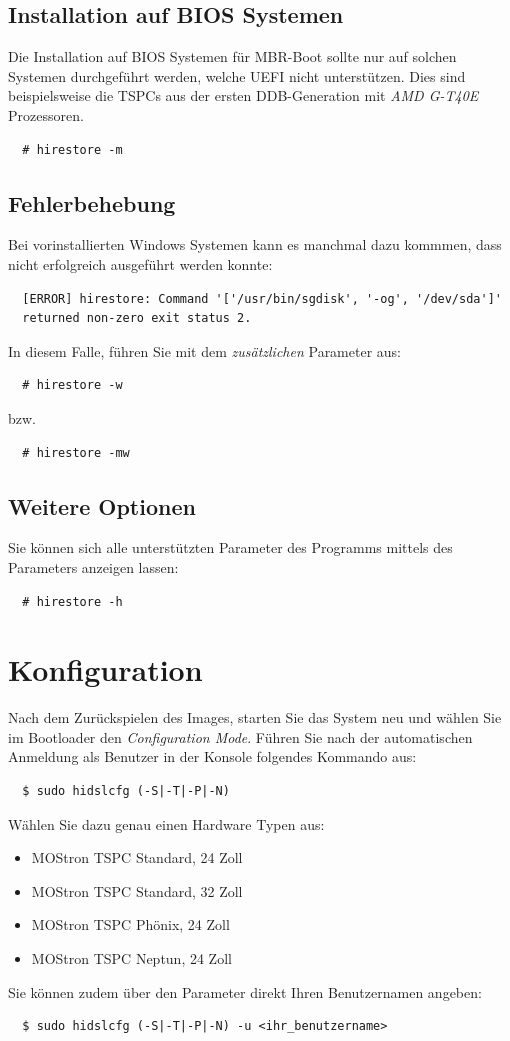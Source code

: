\documentclass[a4paper,11pt,authoryear]{article}
\begin{document}
\subsection{Installation auf BIOS Systemen}
Die Installation auf BIOS Systemen für MBR-Boot sollte nur auf solchen Systemen durchgeführt werden, welche UEFI nicht unterstützen.
Dies sind beispielsweise die TSPCs aus der ersten DDB-Generation mit \emph{AMD G-T40E} Prozessoren.
\begin{verbatim}
  # hirestore -m
\end{verbatim}
\subsection{Fehlerbehebung}
Bei vorinstallierten Windows Systemen kann es manchmal dazu kommmen, dass  nicht erfolgreich ausgeführt werden konnte:
\begin{verbatim}
  [ERROR] hirestore: Command '['/usr/bin/sgdisk', '-og', '/dev/sda']' 
  returned non-zero exit status 2.
\end{verbatim}
In diesem Falle, führen Sie  mit dem \emph{zusätzlichen} Parameter  aus:
\begin{verbatim}
  # hirestore -w
\end{verbatim}
bzw.
\begin{verbatim}
  # hirestore -mw
\end{verbatim}
\subsection{Weitere Optionen}
Sie können sich alle unterstützten Parameter des Programms  mittels des Parameters  anzeigen lassen:
\begin{verbatim}
  # hirestore -h
\end{verbatim}

\section{Konfiguration}
Nach dem Zurückspielen des Images, starten Sie das System neu und wählen Sie im Bootloader den \emph{Configuration Mode}.
Führen Sie nach der automatischen Anmeldung als Benutzer  in der Konsole folgendes Kommando aus:
\begin{verbatim}
  $ sudo hidslcfg (-S|-T|-P|-N)
\end{verbatim}
Wählen Sie dazu genau einen Hardware Typen aus:
\begin{itemize}
  \item {} MOStron TSPC Standard, 24 Zoll
  \item {} MOStron TSPC Standard, 32 Zoll
  \item {} MOStron TSPC Phönix, 24 Zoll
  \item {} MOStron TSPC Neptun, 24 Zoll
\end{itemize}
Sie können zudem über den Parameter  direkt Ihren Benutzernamen angeben:
\begin{verbatim}
  $ sudo hidslcfg (-S|-T|-P|-N) -u <ihr_benutzername>
\end{verbatim}
\end{document}
